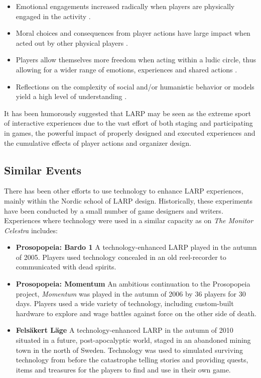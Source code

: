 \begin{itemize}
\item Emotional engagements increased radically when players are physically engaged in the activity \cite{turku3}.
\item Moral choices and consequences from player actions have large impact when acted out by other physical players \cite{turku3}.
\item Players allow themselves more freedom when acting within a ludic circle, thus allowing for a wider range of emotions, experiences and shared actions \cite{montola2012,stenros2012}.
\item Reflections on the complexity of social and/or humanistic behavior or models yield a high level of understanding \cite{henriksen2004}.
\end{itemize}

It has been humorously suggested that LARP may be seen as the extreme sport of interactive experiences due to the vast effort of both staging and participating in games, the powerful impact of properly designed and executed experiences and the cumulative effects of player actions and organizer design.

\subsection{Similar Events}

There has been other efforts to use technology to enhance LARP experiences, mainly within the Nordic school of LARP design. Historically, these experiments have been conducted by a small number of game designers and writers. Experiences where technology were used in a similar capacity as on \emph{The Monitor Celestra} includes: 

\begin{itemize}
\item \textbf{Prosopopeia: Bardo 1} A technology-enhanced LARP played in the autumn of 2005. Players used technology concealed in an old reel-recorder to communicated with dead spirits.
\item \textbf{Prosopopeia: Momentum} An ambitious continuation to the Prosopopeia project, \emph{Momentum} was played in the autumn of 2006 by 36 players for 30 days. Players used a wide variety of technology, including custom-built hardware to explore and wage battles against force on the other side of death. 
\item \textbf{Felsäkert Läge} A technology-enhanced LARP in the autumn of 2010 situated in a future, post-apocalyptic world, staged in an abandoned mining town in the north of Sweden. Technology was used to simulated surviving technology from before the catastrophe telling stories and providing quests, items and treasures for the players to find and use in their own game.
\end{itemize}

